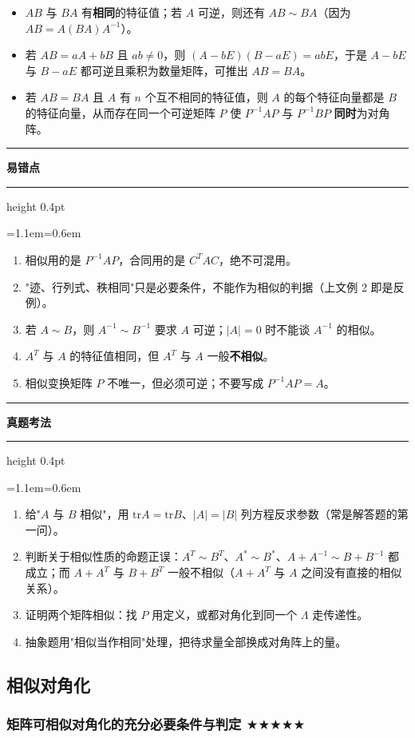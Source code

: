 \documentclass[11pt,openany,UTF8]{ctexbook}
\newcommand{\callouthead}[2]{%
  \par\addvspace{7pt}\noindent
  {\color{#1}\rule[-0.15em]{3pt}{1.05em}}\hspace{0.5em}%
  {\bfseries\color{#1}#2}\par\nobreak\vspace{-0.35em}%
  {\color{rulesep}\hrule height 0.4pt}\nobreak\vspace{0.45em}%
  \begingroup\small\setlength{\parindent}{0pt}%
  \leftskip=1.1em\rightskip=0.6em\noindent\ignorespaces}
\newcommand{\calloutend}{\par\endgroup\addvspace{7pt}}
\newenvironment{callwarn}[1]{\callouthead{warnbar}{#1}}{\calloutend}
\newenvironment{callexam}[1]{\callouthead{exambar}{#1}}{\calloutend}
\begin{document}
\begin{itemize}
\item $AB$ 与 $BA$ 有\textbf{相同}的特征值；若 $A$ 可逆，则还有 $AB\sim BA$（因为 $AB=A(BA)A^{-1}$）。
\item 若 $AB=aA+bB$ 且 $ab\neq0$，则 $(A-bE)(B-aE)=abE$，于是 $A-bE$ 与 $B-aE$ 都可逆且乘积为数量矩阵，可推出 $AB=BA$。
\item 若 $AB=BA$ 且 $A$ 有 $n$ 个互不相同的特征值，则 $A$ 的每个特征向量都是 $B$ 的特征向量，从而存在同一个可逆矩阵 $P$ 使 $P^{-1}AP$ 与 $P^{-1}BP$ \textbf{同时}为对角阵。
\end{itemize}
\begin{callwarn}{易错点}
\begin{enumerate}
\item 相似用的是 $P^{-1}AP$，合同用的是 $C^TAC$，绝不可混用。
\item "迹、行列式、秩相同"只是必要条件，不能作为相似的判据（上文例 2 即是反例）。
\item 若 $A\sim B$，则 $A^{-1}\sim B^{-1}$ 要求 $A$ 可逆；$\vert A\vert=0$ 时不能谈 $A^{-1}$ 的相似。
\item $A^T$ 与 $A$ 的特征值相同，但 $A^T$ 与 $A$ 一般\textbf{不相似}。
\item 相似变换矩阵 $P$ 不唯一，但必须可逆；不要写成 $P^{-1}AP=A$。
\end{enumerate}
\end{callwarn}

\begin{callexam}{真题考法}
\begin{enumerate}
\item 给"$A$ 与 $B$ 相似"，用 $\mathrm{tr}A=\mathrm{tr}B$、$\vert A\vert=\vert B\vert$ 列方程反求参数（常是解答题的第一问）。
\item 判断关于相似性质的命题正误：$A^T\sim B^T$、$A^*\sim B^*$、$A+A^{-1}\sim B+B^{-1}$ 都成立；而 $A+A^T$ 与 $B+B^T$ 一般不相似（$A+A^T$ 与 $A$ 之间没有直接的相似关系）。
\item 证明两个矩阵相似：找 $P$ 用定义，或都对角化到同一个 $\Lambda$ 走传递性。
\item 抽象题用"相似当作相同"处理，把待求量全部换成对角阵上的量。
\end{enumerate}
\end{callexam}

\subsection{相似对角化}

\subsubsection{矩阵可相似对角化的充分必要条件与判定 $\bigstar$$\bigstar$$\bigstar$$\bigstar$$\bigstar$}
\end{document}
